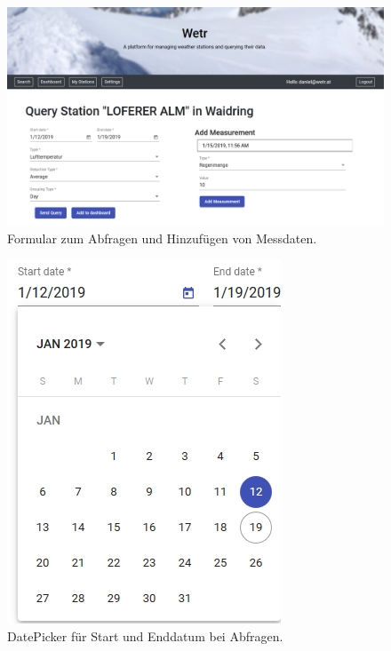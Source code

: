 \documentclass[12pt, letterpaper]{article}
\begin{document}
\begin{figure}[H]
    \centering
    \includegraphics[width=\textwidth]{img/query/query_form.png}
    \caption{Formular zum Abfragen und Hinzufügen von Messdaten.}
    \label{fig:query_form}
\end{figure}

\begin{figure}[H]
    \centering
    \includegraphics[scale=1.0]{img/query/query_date.png}
    \caption{DatePicker für Start und Enddatum bei Abfragen.}
    \label{fig:query_datepicker}
\end{figure}
\end{document}
